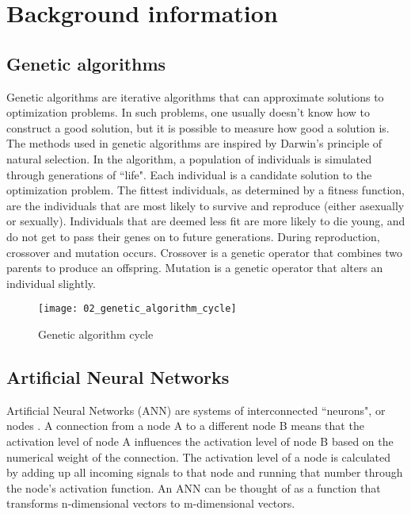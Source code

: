 \chapter{Background information}

\section{Genetic algorithms}
Genetic algorithms \citep{goldberg1989, back1996} are iterative algorithms that can approximate solutions to optimization problems. In such problems, one usually doesn’t know how to construct a good solution, but it is possible to measure how good a solution is. The methods used in genetic algorithms are inspired by Darwin's principle of natural selection. In the algorithm, a population of individuals is simulated through generations of ``life". Each individual is a candidate solution to the optimization problem. The fittest individuals, as determined by a fitness function, are the individuals that are most likely to survive and reproduce (either asexually or sexually). Individuals that are deemed less fit are more likely to die young, and do not get to pass their genes on to future generations. During reproduction, crossover and mutation occurs. Crossover is a genetic operator that combines two parents to produce an offspring. Mutation is a genetic operator that alters an individual slightly.

\begin{figure}[h]
    \centering
    \texttt{[image: 02\_genetic\_algorithm\_cycle]}
    \caption{Genetic algorithm cycle}
    \label{fig:genetic_algorithm_cycle}
\end{figure}

\section{Artificial Neural Networks}
Artificial Neural Networks (ANN) are systems of interconnected ``neurons", or nodes \citep{caudill1987}. A connection from a node A to a different node B means that the activation level of node A influences the activation level of node B based on the numerical weight of the connection. The activation level of a node is calculated by adding up all incoming signals to that node and running that number through the node's activation function. An ANN can be thought of as a function that transforms n-dimensional vectors to m-dimensional vectors.

